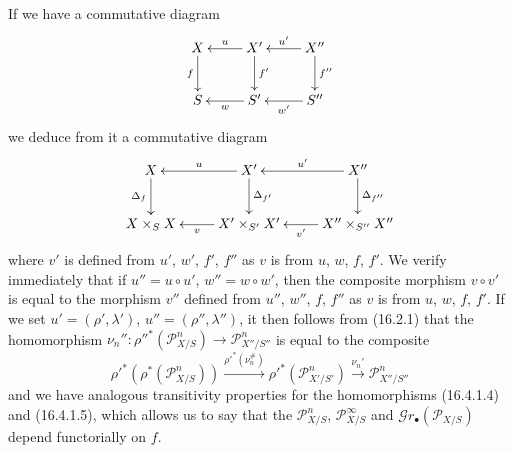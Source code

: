 \begin{env}[16.4.2]
\label{IV.16.4.2}
If we have a commutative diagram
\[
  \xymatrix{
    X \ar[d]_-{f} & X' \ar[l]_-u \ar[d]^-{f'} &
      X'' \ar[l]_-{u'} \ar[d]^-{f''} \\
    S & S' \ar[l]^-w & S'' \ar[l]^-{w'}
  }
\]
we deduce from it a commutative diagram
\[
  \xymatrix{
    X \ar[d]_-{\Delta_f} & X' \ar[l]_-u \ar[d]^-{\Delta_{f'}} &
      X'' \ar[l]_-{u'} \ar[d]^-{\Delta_{f''}} \\
    X\times_S X & X'\times_{S'}X' \ar[l]^-v &
      X''\times_{S''}X'' \ar[l]^-{v'}
  }
\]
where $v'$ is defined from $u'$, $w'$, $f'$, $f''$ as $v$ is from
$u$, $w$, $f$, $f'$. We verify immediately that if $u''=u\circ u'$,
$w''=w\circ w'$, then the composite morphism $v\circ v'$ is equal to the morphism
$v''$ defined from $u''$, $w''$, $f$, $f''$ as $v$ is from $u$,
$w$, $f$, $f'$. If we set $u'=(\rho',\lambda')$,
$u''=(\rho'',\lambda'')$, it then follows from (16.2.1) that the homomorphism
$\nu_n'':\rho''^*(\mathscr{P}_{X/S}^n)\to\mathscr{P}_{X''/S''}^n$ is equal to the
composite
\[
  \rho'^*(\rho^*(\mathscr{P}_{X/S}^n))
  \xrightarrow{\rho'^*(\nu_n^\#)}
  \rho'^*(\mathscr{P}_{X'/S'}^n)
  \xrightarrow{\nu_n'}\mathscr{P}_{X''/S''}^n
\]
and we have analogous transitivity properties for the homomorphisms
(16.4.1.4) and (16.4.1.5), which allows us to say that the
$\mathscr{P}_{X/S}^n$, $\mathscr{P}_{X/S}^\infty$ and
$\mathscr{G}r_\bullet(\mathscr{P}_{X/S})$ depend functorially on $f$.
\end{env}

